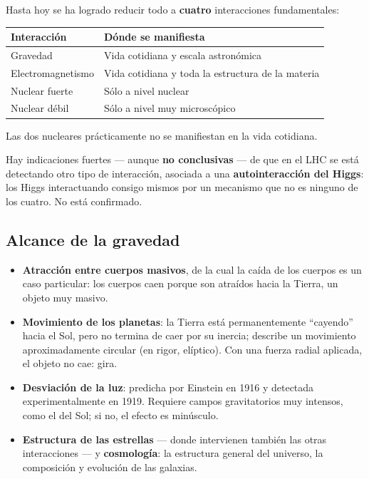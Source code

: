 \documentclass[12pt,a4paper]{article}
\begin{document}
Hasta hoy se ha logrado reducir todo a \textbf{cuatro} interacciones
fundamentales:

\begin{table}[H]
\centering
\begin{tabular}{ll}
\toprule
\textbf{Interacción} & \textbf{Dónde se manifiesta} \\
\midrule
Gravedad          & Vida cotidiana y escala astronómica \\
Electromagnetismo & Vida cotidiana y toda la estructura de la materia \\
Nuclear fuerte    & Sólo a nivel nuclear \\
Nuclear débil     & Sólo a nivel muy microscópico \\
\bottomrule
\end{tabular}
\end{table}

Las dos nucleares prácticamente no se manifiestan en la vida cotidiana.

\begin{notebox}
Hay indicaciones fuertes --- aunque \textbf{no conclusivas} --- de que en el LHC
se está detectando otro tipo de interacción, asociada a una
\textbf{autointeracción del Higgs}: los Higgs interactuando consigo mismos por un
mecanismo que no es ninguno de los cuatro. No está confirmado.
\end{notebox}

\subsection{Alcance de la gravedad}

\begin{itemize}
  \item \textbf{Atracción entre cuerpos masivos}, de la cual la caída de los
        cuerpos es un caso particular: los cuerpos caen porque son atraídos hacia
        la Tierra, un objeto muy masivo.
  \item \textbf{Movimiento de los planetas}: la Tierra está permanentemente
        \enquote{cayendo} hacia el Sol, pero no termina de caer por su inercia;
        describe un movimiento aproximadamente circular (en rigor, elíptico). Con
        una fuerza radial aplicada, el objeto no cae: gira.
  \item \textbf{Desviación de la luz}: predicha por Einstein en 1916 y detectada
        experimentalmente en 1919. Requiere campos gravitatorios muy intensos,
        como el del Sol; si no, el efecto es minúsculo.
  \item \textbf{Estructura de las estrellas} --- donde intervienen también las
        otras interacciones --- y \textbf{cosmología}: la estructura general del
        universo, la composición y evolución de las galaxias.
\end{itemize}
\end{document}

